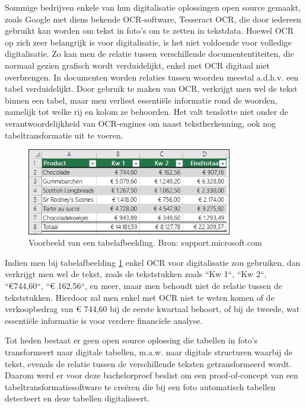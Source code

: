 Sommige bedrijven enkele van hun digitalisatie oplossingen open source gemaakt, zoals Google met diens bekende OCR-software, Tesseract OCR, die door iedereen gebruikt kan worden om tekst in foto’s om te zetten in tekstdata. Hoewel \Gls{OCR} op zich zeer belangrijk is voor digitalisatie, is het niet voldoende voor volledige digitalisatie. Zo kan men de relatie tussen verschillende documententiteiten, die normaal gezien grafisch wordt verduidelijkt, enkel met \Gls{OCR} digitaal niet overbrengen. In documenten worden relaties tussen woorden meestal a.d.h.v. een tabel verduidelijkt. Door gebruik te maken van \Gls{OCR}, verkrijgt men wel de tekst binnen een tabel, maar men verliest essentiële informatie rond de woorden, namelijk tot welke rij en kolom ze behoorden. Het valt tenslotte niet onder de verantwoordelijkheid van OCR-engines om naast tekstherkenning, ook nog tabeltransformatie uit te voeren.

\begin{figure}[h]
    \centering
    \includegraphics[width=0.8\textwidth]{img/tabel_verduidelijking_relaties_woorden.png}
    \caption{Voorbeeld van een tabelafbeelding. Bron: support.microsoft.com}
    \label{fig:tabel_verduidelijking_relaties_woorden}
\end{figure}

Indien men bij tabelafbeelding \ref{fig:tabel_verduidelijking_relaties_woorden} enkel \Gls{OCR} voor digitalisatie zou gebruiken, dan verkrijgt men wel de tekst, zoals de tekststukken zoals ``Kw 1``, ``Kw 2``, ``€744,60``, ``€ 162,56``, en meer, maar men behoudt niet de relatie tussen de tekststukken. Hierdoor zal men enkel met \Gls{OCR} niet te weten komen of de verkoopbedrag van € 744,60 bij de eerste kwartaal behoort, of bij de tweede, wat essentiële informatie is voor verdere financïele analyse.

Tot heden bestaat er geen open source oplossing die tabellen in foto's transformeert naar digitale tabellen, m.a.w. naar digitale structuren waarbij de tekst, evenals de relatie tussen de verschillende teksten getransformeerd wordt. Daarom werd er voor deze bachelorproef beslist om een proof-of-concept van een tabeltransformatiesoftware te creëren die bij een foto automatisch tabellen detecteert en deze tabellen digitaliseert.

